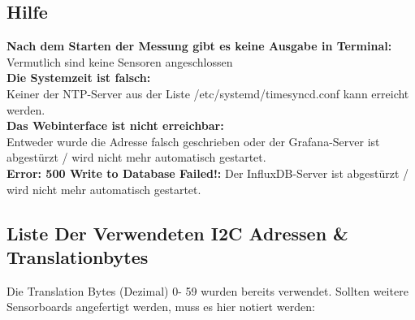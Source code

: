 \subsection{Hilfe}
\textbf{Nach dem Starten der Messung gibt es keine Ausgabe in Terminal:}\\
Vermutlich sind keine Sensoren angeschlossen\\
\textbf{Die Systemzeit ist falsch:}\\
Keiner der NTP-Server aus der Liste /etc/systemd/timesyncd.conf kann erreicht werden.\\
\textbf{Das Webinterface ist nicht erreichbar:}\\
Entweder wurde die Adresse falsch geschrieben oder der Grafana-Server ist abgestürzt / wird nicht mehr automatisch gestartet.\\
\textbf{Error: 500
Write to Database Failed!:}
Der InfluxDB-Server ist abgestürzt / wird nicht mehr automatisch gestartet.
\subsection{Liste Der Verwendeten I2C Adressen \& Translationbytes}
\label{liste_Translationbytes}
Die Translation Bytes (Dezimal) 0- 59 wurden bereits verwendet. Sollten weitere Sensorboards angefertigt werden, muss es hier notiert werden:






